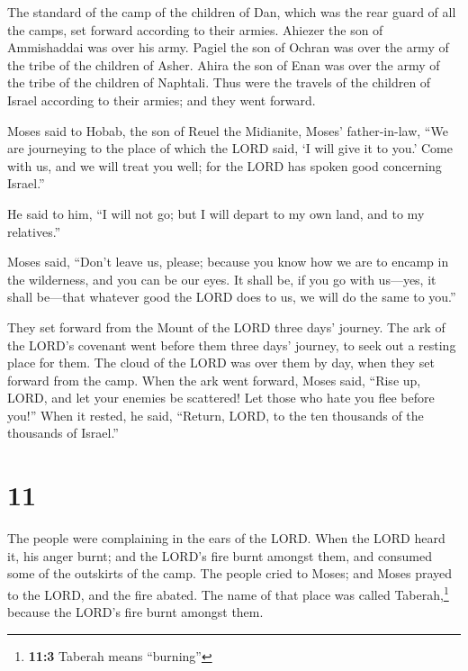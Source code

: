  The standard of the camp of the children of Dan, which
was the rear guard of all the camps, set forward according to their
armies. Ahiezer the son of Ammishaddai was over his army.
 Pagiel the son of Ochran was over the army of the tribe
of the children of Asher.  Ahira the son of Enan was over
the army of the tribe of the children of Naphtali.  Thus
were the travels of the children of Israel according to their armies;
and they went forward.

 Moses said to Hobab, the son of Reuel the Midianite,
Moses' father-in-law, ``We are journeying to the place of which the LORD
said, `I will give it to you.' Come with us, and we will treat you well;
for the LORD has spoken good concerning Israel.''

 He said to him, ``I will not go; but I will depart to my
own land, and to my relatives.''

 Moses said, ``Don't leave us, please; because you know
how we are to encamp in the wilderness, and you can be our eyes.
 It shall be, if you go with us---yes, it shall be---that
whatever good the LORD does to us, we will do the same to you.''

 They set forward from the Mount of the LORD three days'
journey. The ark of the LORD's covenant went before them three days'
journey, to seek out a resting place for them.  The cloud
of the LORD was over them by day, when they set forward from the camp.
 When the ark went forward, Moses said, ``Rise up, LORD,
and let your enemies be scattered! Let those who hate you flee before
you!''  When it rested, he said, ``Return, LORD, to the
ten thousands of the thousands of Israel.''

\hypertarget{section-10}{%
\section{11}\label{section-10}}

 The people were complaining in the ears of the LORD. When
the LORD heard it, his anger burnt; and the LORD's fire burnt amongst
them, and consumed some of the outskirts of the camp.  The
people cried to Moses; and Moses prayed to the LORD, and the fire
abated.  The name of that place was called
Taberah,\footnote{\textbf{11:3} Taberah means ``burning''} because the
LORD's fire burnt amongst them.

